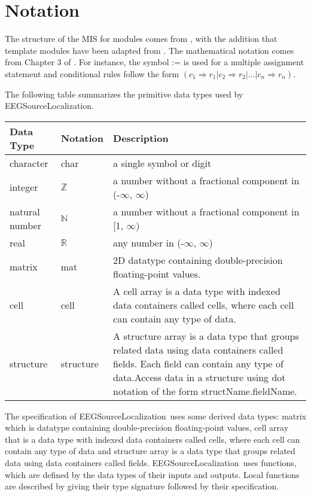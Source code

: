 \documentclass[12pt, titlepage]{article}
\renewcommand{\progname}{EEGSourceLocalization}
\begin{document}
\section{Notation}

The structure of the MIS for modules comes from \citet{HoffmanAndStrooper1995},
with the addition that template modules have been adapted from
\cite{GhezziEtAl2003}.  The mathematical notation comes from Chapter 3 of
\citet{HoffmanAndStrooper1995}.  For instance, the symbol := is used for a
multiple assignment statement and conditional rules follow the form $(c_1
\Rightarrow r_1 | c_2 \Rightarrow r_2 | ... | c_n \Rightarrow r_n )$.

The following table summarizes the primitive data types used by \progname. 

\begin{center}
\renewcommand{\arraystretch}{1.2}
\noindent 
\begin{tabular}{l l p{7.5cm}} 
\toprule 
\textbf{Data Type} & \textbf{Notation} & \textbf{Description}\\ 
\midrule
character & char & a single symbol or digit\\
integer & $\mathbb{Z}$ & a number without a fractional component in (-$\infty$, $\infty$) \\
natural number & $\mathbb{N}$ & a number without a fractional component in [1, $\infty$) \\
real & $\mathbb{R}$ & any number in (-$\infty$, $\infty$)\\
matrix & mat &  2D datatype containing double-precision floating-point values.\\
cell & cell & A cell array is a data type with indexed data containers called cells, where each cell can contain any type of data.\\
structure & structure & A structure array is a data type that groups related data using data containers called fields. Each field can contain any type of data.Access data in a structure using dot notation of the form structName.fieldName.\\

\bottomrule
\end{tabular} 
\end{center}

\noindent
The specification of \progname \ uses some derived data types: matrix which is datatype containing double-precision floating-point values, cell array that is a data type with indexed data containers called cells, where each cell can contain any type of data and structure array is a data type that groups related data using data containers called fields. \progname \ uses functions, which
are defined by the data types of their inputs and outputs. Local functions are
described by giving their type signature followed by their specification.
\end{document}

